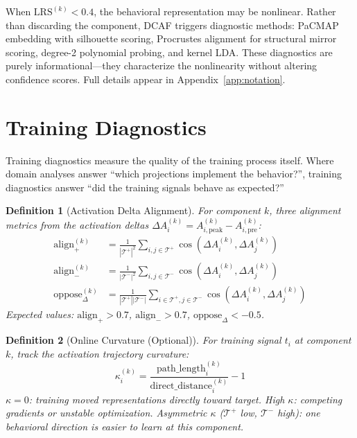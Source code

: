 \documentclass[11pt]{article}
\newtheorem{definition}{Definition}[section]
\begin{document}
When $\text{LRS}^{(k)} < 0.4$, the behavioral representation may be nonlinear. Rather than discarding the component, DCAF triggers diagnostic methods: PaCMAP embedding with silhouette scoring, Procrustes alignment for structural mirror scoring, degree-2 polynomial probing, and kernel LDA. These diagnostics are purely informational---they characterize the nonlinearity without altering confidence scores. Full details appear in Appendix~\ref{app:notation}.


\section{Training Diagnostics}
\label{sec:training-diag}

Training diagnostics measure the quality of the training process itself. Where domain analyses answer ``which projections implement the behavior?'', training diagnostics answer ``did the training signals behave as expected?''

\begin{definition}[Activation Delta Alignment]
For component $k$, three alignment metrics from the activation deltas $\Delta A^{(k)}_i = A^{(k)}_{i,\text{peak}} - A^{(k)}_{i,\text{pre}}$:
\begin{align}
\text{align}^{(k)}_+ &= \frac{1}{|\mathcal{T}^+|^2}\sum_{i,j \in \mathcal{T}^+} \cos(\Delta A^{(k)}_i, \Delta A^{(k)}_j) \\
\text{align}^{(k)}_- &= \frac{1}{|\mathcal{T}^-|^2}\sum_{i,j \in \mathcal{T}^-} \cos(\Delta A^{(k)}_i, \Delta A^{(k)}_j) \\
\text{oppose}^{(k)}_{\Delta} &= \frac{1}{|\mathcal{T}^+||\mathcal{T}^-|}\sum_{i \in \mathcal{T}^+, j \in \mathcal{T}^-} \cos(\Delta A^{(k)}_i, \Delta A^{(k)}_j)
\end{align}
Expected values: $\text{align}_+ > 0.7$, $\text{align}_- > 0.7$, $\text{oppose}_\Delta < -0.5$.
\end{definition}

\begin{definition}[Online Curvature (Optional)]
For training signal $t_i$ at component $k$, track the activation trajectory curvature:
\begin{equation}
\kappa^{(k)}_i = \frac{\text{path\_length}^{(k)}_i}{\text{direct\_distance}^{(k)}_i} - 1
\end{equation}
$\kappa = 0$: training moved representations directly toward target. High $\kappa$: competing gradients or unstable optimization. Asymmetric $\kappa$ ($\mathcal{T}^+$ low, $\mathcal{T}^-$ high): one behavioral direction is easier to learn at this component.
\end{definition}
\end{document}
